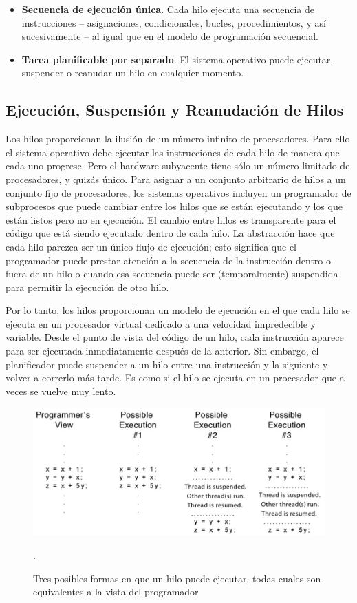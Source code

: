 \documentclass[10pt]{book}
\begin{document}
\begin{itemize}
\item  \textbf{Secuencia de ejecución única}. Cada hilo ejecuta una secuencia de instrucciones -- asignaciones, condicionales, bucles, procedimientos, y así sucesivamente -- al igual que en el modelo de programación secuencial.
\item \textbf{Tarea planificable por separado}. El sistema operativo puede ejecutar, suspender o reanudar un hilo en cualquier momento.
\end{itemize}

\subsection{Ejecución, Suspensión y Reanudación de Hilos}
Los hilos proporcionan la ilusión de un número infinito de procesadores. Para ello el sistema operativo debe ejecutar las instrucciones de cada hilo de manera que cada uno progrese. Pero el hardware subyacente tiene sólo un número limitado de procesadores, y quizás único. Para asignar a un conjunto arbitrario de hilos a un conjunto fijo de procesadores, los sistemas operativos incluyen un programador de subprocesos que puede cambiar entre los hilos que se están ejecutando y los que están listos pero no en ejecución. El cambio entre hilos es transparente para el código que está siendo ejecutado dentro de cada hilo. La abstracción hace que cada hilo parezca ser un único flujo de ejecución; esto significa que el programador puede prestar atención a la secuencia de la instrucción dentro o fuera de un hilo o cuando esa secuencia puede ser (temporalmente) suspendida para permitir la ejecución de otro hilo.

Por lo tanto, los hilos proporcionan un modelo de ejecución en el que cada hilo se ejecuta en un procesador virtual dedicado a una velocidad impredecible y variable. Desde el punto de vista del código de un hilo, cada instrucción aparece para ser ejecutada inmediatamente después de la anterior. Sin embargo, el planificador puede suspender a un hilo entre una instrucción y la siguiente y volver a correrlo más tarde. Es como si el hilo se ejecuta en un procesador que a veces se vuelve muy lento.

\begin{figure}[tbhp]
\centerline{\includegraphics[scale=0.50]{img/fig0401}}
\caption{Tres posibles formas en que un hilo puede ejecutar, todas cuales son equivalentes a la vista del programador}.
\label{fig0401}
\end{figure}
\end{document}
